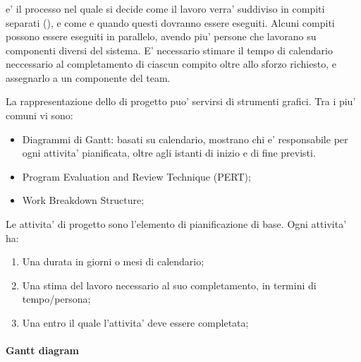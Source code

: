 \subsubsection{}


 e' il processo nel quale si decide come il lavoro
verra' suddiviso in compiti separati (), e come e quando questi
dovranno essere eseguiti. Alcuni compiti possono essere eseguiti in parallelo,
avendo piu' persone che lavorano su componenti diversi del sistema. E'
necessario stimare il tempo di calendario neccessario al completamento di
ciascun compito oltre allo sforzo richiesto, e assegnarlo a un componente del
team.


La rappresentazione dello  di progetto puo' servirsi di
strumenti grafici. Tra i piu' comuni vi sono:

\begin{itemize}
  \item Diagrammi di Gantt: basati su calendario, mostrano chi e' responsabile
    per ogni attivita' pianificata, oltre agli istanti di inizio e di fine
    previsti.
  \item Program Evaluation and Review Technique (PERT);
  \item Work Breakdown Structure;
\end{itemize}

Le attivita' di progetto sono l'elemento di pianificazione di base. Ogni
attivita' ha:

\begin{enumerate}
  \item Una durata in giorni o mesi di calendario;
  \item Una stima del lavoro necessario al suo completamento, in termini di
    tempo/persona;
  \item Una  entro il quale l'attivita' deve essere
    completata;
\end{enumerate}

\paragraph{Gantt diagram}


